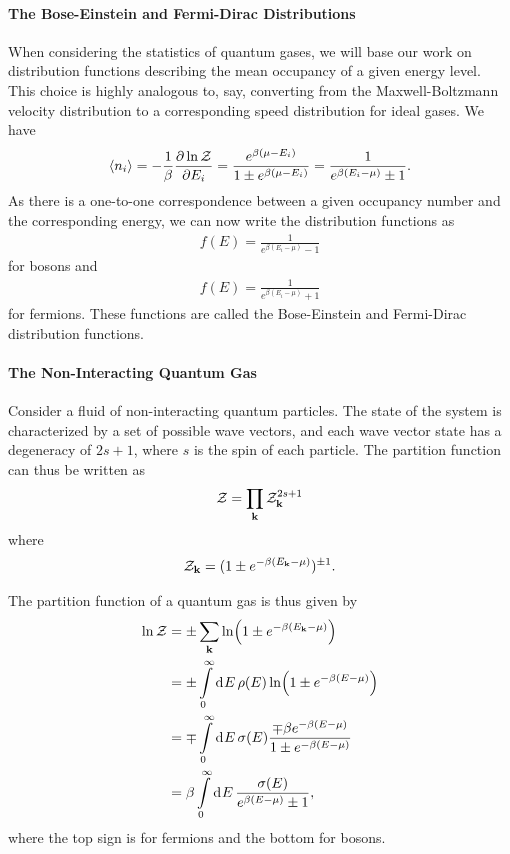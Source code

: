 \paragraph{The Bose-Einstein and Fermi-Dirac Distributions}
When considering the statistics of quantum gases, we will base our work on distribution functions describing the mean occupancy of a given energy level. This choice is highly analogous to, say, converting from the Maxwell-Boltzmann velocity distribution to a corresponding speed distribution for ideal gases. We have
\begin{align*}
	\expval{n_{i}} = -\frac{1}{\beta}\pdv{\ln{\mathcal{Z}}}{E_{i}} = \frac{e^{\beta(\mu - E_{i})}}{1 \pm e^{\beta(\mu - E_{i})}} = \frac{1}{e^{\beta(E_{i} - \mu)} \pm 1}.
\end{align*}
As there is a one-to-one correspondence between a given occupancy number and the corresponding energy, we can now write the distribution functions as
\begin{align*}
	f(E) = \frac{1}{e^{\beta(E_{i} - \mu)} - 1}
\end{align*}
for bosons and
\begin{align*}
	f(E) = \frac{1}{e^{\beta(E_{i} - \mu)} + 1}
\end{align*}
for fermions. These functions are called the Bose-Einstein and Fermi-Dirac distribution functions.

\paragraph{The Non-Interacting Quantum Gas}
Consider a fluid of non-interacting quantum particles. The state of the system is characterized by a set of possible wave vectors, and each wave vector state has a degeneracy of $2s + 1$, where $s$ is the spin of each particle. The partition function can thus be written as
\begin{align*}
	\mathcal{Z} = \prod\limits_{\vb{k}}\mathcal{Z}_{\vb{k}}^{2s + 1}
\end{align*}
where
\begin{align*}
	\mathcal{Z}_{\vb{k}} = (1 \pm e^{-\beta(E_{\vb{k}} - \mu)})^{\pm 1}.
\end{align*}

The partition function of a quantum gas is thus given by
\begin{align*}
	\ln{\mathcal{Z}} &= \pm\sum\limits_{\vb{k}}\ln(1 \pm e^{-\beta(E_{\vb{k}} - \mu)}) \\
	        &= \pm\int\limits_{0}^{\infty}\dd[]{E}\rho(E)\ln(1 \pm e^{-\beta(E - \mu)}) \\
	        &= \mp\int\limits_{0}^{\infty}\dd[]{E}\sigma(E)\frac{\mp\beta e^{-\beta(E - \mu)}}{1 \pm e^{-\beta(E - \mu)}} \\
	        &= \beta\int\limits_{0}^{\infty}\dd[]{E}\frac{\sigma(E)}{e^{\beta(E - \mu)} \pm 1},
\end{align*}
where the top sign is for fermions and the bottom for bosons.

